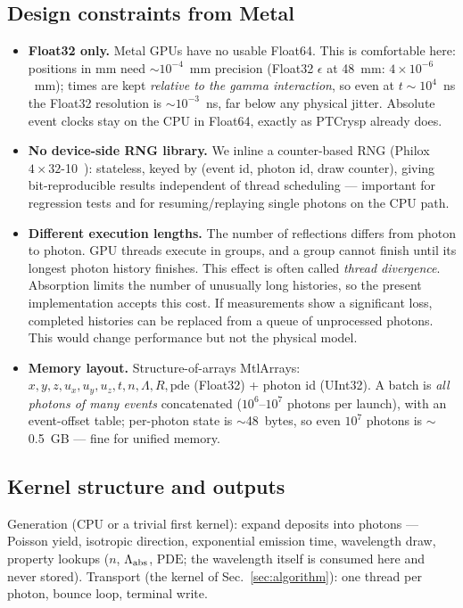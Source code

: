 \documentclass[11pt,a4paper]{article}
\begin{document}
\subsection{Design constraints from Metal}

\begin{itemize}
  \item \textbf{Float32 only.} Metal GPUs have no usable Float64. This is comfortable here:
    positions in mm need $\sim$$10^{-4}$~mm precision (Float32 $\epsilon$ at 48~mm:
    $4\times10^{-6}$~mm); times are kept \emph{relative to the gamma interaction}, so even at
    $t \sim 10^4$~ns the Float32 resolution is $\sim$$10^{-3}$~ns, far below any physical
    jitter. Absolute event clocks stay on the CPU in Float64, exactly as PTCrysp already
    does.
  \item \textbf{No device-side RNG library.} We inline a counter-based RNG
    (Philox\,$4\times32$-10~\cite{philox}): stateless, keyed by (event id, photon id, draw
    counter), giving bit-reproducible results independent of thread scheduling --- important
    for regression tests and for resuming/replaying single photons on the CPU path.
  \item \textbf{Different execution lengths.} The number of reflections differs from
    photon to photon. GPU threads execute in groups, and a group cannot finish until its
    longest photon history finishes. This effect is often called \emph{thread divergence}.
    Absorption limits the number of unusually long histories, so the present implementation
    accepts this cost. If measurements show a significant loss, completed histories can be
    replaced from a queue of unprocessed photons. This would change performance but not the
    physical model.
  \item \textbf{Memory layout.} Structure-of-arrays MtlArrays:
    $x, y, z, u_x, u_y, u_z, t, n, \Lambda, R, \mathrm{pde}$ (Float32) + photon id
    (UInt32). A batch is \emph{all photons of many events} concatenated ($10^6$--$10^7$
    photons per launch), with an event-offset table; per-photon state is
    $\sim$48~bytes, so even $10^7$ photons is $\sim$0.5~GB --- fine for unified memory.
\end{itemize}

\subsection{Kernel structure and outputs}

Generation (CPU or a trivial first kernel): expand deposits into photons --- Poisson yield,
isotropic direction, exponential emission time, wavelength draw, property lookups
($n$, $\Lambda_{\rm abs}$, $\mathrm{PDE}$; the wavelength itself is consumed here and never
stored). Transport (the kernel of Sec.~\ref{sec:algorithm}): one thread per photon, bounce
loop, terminal write.
\end{document}
